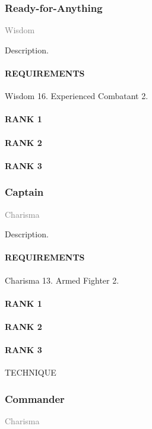 \subsubsection{Ready-for-Anything} \label{feat::readyforanything} %
\small{\textcolor{gray}{Wisdom}}

\normalsize
Description.
\paragraph{REQUIREMENTS} Wisdom 16. Experienced Combatant 2.
\paragraph{RANK 1}
\paragraph{RANK 2}
\paragraph{RANK 3}

\subsubsection{Captain} \label{feat::captain}
\small{\textcolor{gray}{Charisma}}

\normalsize
Description.
\paragraph{REQUIREMENTS} Charisma 13. Armed Fighter 2.
\paragraph{RANK 1}
\paragraph{RANK 2}
\paragraph{RANK 3} TECHNIQUE

\subsubsection{Commander} \label{feat::commander}
\small{\textcolor{gray}{Charisma}}

